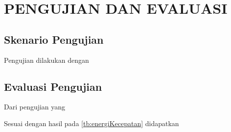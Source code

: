 \chapter{PENGUJIAN DAN EVALUASI}
\vspace{4ex}

\setlength{\parindent}{7ex}

\section{Skenario Pengujian}
\vspace{1ex}

Pengujian dilakukan dengan \lipsum[1]
\vspace{0.5ex}

\lipsum[2]
\vspace{0.5ex}

\newpage

\section{Evaluasi Pengujian}
\vspace{1ex}

Dari pengujian yang \lipsum[3]
\vspace{0.5ex}

Sesuai dengan hasil pada \ref{tb:energiKecepatan} didapatkan \lipsum[4]


\vspace{1ex}

\lipsum[5]
\vspace{0.5ex}